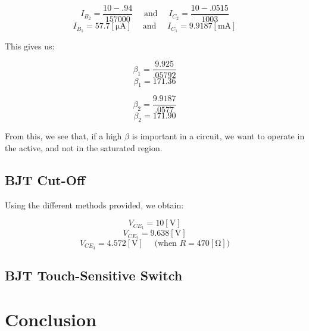 \documentclass[
	letterpaper, %
	10pt, %
]{CSUniSchoolLabReport}
\begin{document}
$$I_{B_2}=\frac{10-.94}{157000}\quad\text{ and }\quad I_{C_2}=\frac{10-.0515}{1003}$$
$$\boxed{I_{B_1}=57.7[\si{\micro\ampere}]\quad\text{ and }\quad I_{C_1}=9.9187[\si{\milli\ampere}]}$$

This gives us:

$$\beta_1=\frac{9.925}{.05792}$$
$$\boxed{\beta_1=171.36}$$

$$\beta_2=\frac{9.9187}{.0577}$$
$$\boxed{\beta_2=171.90}$$

From this, we see that, if a high $\beta$ is important in a circuit, we want to operate in the active, and not in the saturated region.

\subsection{BJT Cut-Off}

Using the different methods provided, we obtain:

$$V_{CE_1}=10[\si{\volt}]$$
$$V_{CE_2}=9.638[\si{\volt}]$$
$$V_{CE_3}=4.572[\si{\volt}]\quad\text{ (when $R=470[\si{\ohm}]$)}$$

\subsection{BJT Touch-Sensitive Switch}

\section{Conclusion}
\end{document}
